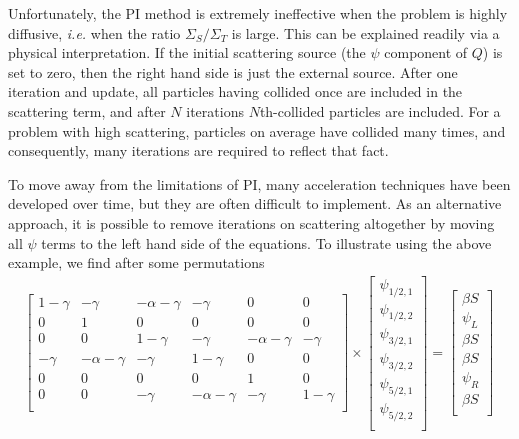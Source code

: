 \documentclass[final,3p,times,11pt]{elsarticle}
\newcommand{\ie}{{\it i.e. }}
\begin{document}
  Unfortunately, the PI method is extremely ineffective when the problem is highly diffusive, \ie when the ratio $\Sigma_S/\Sigma_T$ is large.  This can be explained readily via a physical interpretation.  If the initial scattering source (the $\psi$ component of $Q$) is set to zero, then the right hand side is just the external source.  After one iteration and update, all particles having collided once are included in the scattering term, and after $N$ iterations $N$th-collided particles are included.  For a problem with high scattering, particles on average have collided many times, and consequently, many iterations are required to reflect that fact.

   To move away from the limitations of PI, many acceleration techniques have been developed over time, but they are often difficult to implement.  As an alternative approach, it is possible to remove iterations on scattering altogether by moving all $\psi$ terms to the left hand side of the equations.  To illustrate using the above example, we find after some permutations
    {\small
    \begin{equation}
    \begin{split}
    \left
    [\begin{array}{cccccc}
    1-\gamma   &  -\gamma        & -\alpha-\gamma  &  -\gamma       &  0              &  0  \\
	    0  &       1         &  0              &  0             &  0              &  0  \\
	    0  &       0         & 1-\gamma        & -\gamma        & -\alpha-\gamma  & -\gamma \\
    -\gamma    & -\alpha-\gamma  &  -\gamma        & 1-\gamma       &  0              &  0  \\
	    0  &  0              &  0              &  0             &  1              &  0  \\
	    0  &  0              &  -\gamma        & -\alpha-\gamma &  -\gamma        & 1-\gamma   \\
    \end{array} 
    \right ]
    \times \left
    [\begin{array}{c}
      \psi_{1/2,1}     \\
      \psi_{1/2,2}     \\
      \psi_{3/2,1}     \\
      \psi_{3/2,2}     \\
      \psi_{5/2,1}     \\
      \psi_{5/2,2}     \\
    \end{array} 
    \right ] = 
    \left
    [\begin{array}{c}
      \beta S    \\
      \psi_{L}    \\
      \beta S    \\
      \beta S    \\
      \psi_{R}    \\
      \beta S    \\
    \end{array} 
    \right ] \, 
    \end{split}
    \label{eq:simp_matx} 
    \end{equation}
    }
\end{document}
